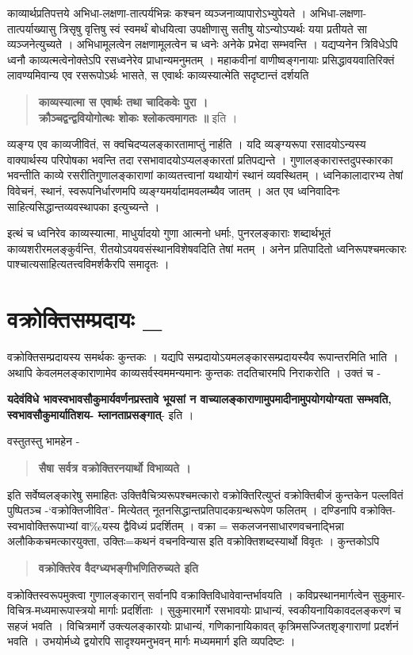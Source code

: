 काव्यार्थप्रतिपत्तये अभिधा-लक्षणा-तात्पर्यभिन्नः कश्चन व्यञ्जनाव्यापारोऽभ्युपेयते । अभिधा-लक्षणा-तात्पर्याख्यासु त्रिसृषु वृत्तिषु स्वं स्वमर्थं बोधयित्वा उपक्षीणासु सतीषु योऽन्योऽप्यर्थः यया प्रतीयते सा व्यञ्जनेत्युच्यते । अभिधामूलत्वेन लक्षणामूलत्वेन च ध्वनेः अनेके प्रभेदा सम्भवन्ति । यद्यप्यनेन त्रिविधेऽपि ध्वनौ काव्यत्मत्वेनोक्तेऽपि रसध्वनेरेव प्राधान्यमनुमतम् । महाकवीनां वाणीष्वङ्गनायाः प्रसिद्धावयवातिरिक्तं लावण्यमिवान्य एव रसरूपोऽर्थः भासते, स एवार्थः काव्यस्यात्मेति सदृष्टान्तं दर्शयति 
\begin{verse}
\textbf{काव्यस्यात्मा स एवार्थः तथा चादिकवेः पुरा ।\\
क्रौञ्चद्वन्द्ववियोगोत्थः शोकः श्लोकत्वमागतः ॥} इति ।
\end{verse}
व्यङ्ग्य एव काव्यजीवितं, स क्वचिदप्यलङ्कारतामाप्तुं नार्हति । यदि व्यङ्ग्यरूपा रसादयोऽन्यस्य वाक्यार्थस्य परिपोषका भवन्ति तदा रसभावादयोऽप्यलङ्कारतां प्रतिपद्यन्ते । गुणालङ्कारास्तदुपस्कारका भवन्तीति काव्ये रसरीतिगुणालङ्काराणां काव्यतत्त्वानां यथायोगं स्थानं व्यवस्थितम् । ध्वनिकालादारभ्य तेषां विवेचनं, स्थानं, स्वरूपनिर्धारणमपि व्यङ्ग्यमर्यादामवलम्ब्यैव जातम् । अत एव ध्वनिवादिनः साहित्यसिद्धान्तव्यवस्थापका इत्युच्यन्ते ।

इत्थं च ध्वनिरेव काव्यस्यात्मा, माधुर्यादयो गुणा आत्मनो धर्माः, पुनरलङ्काराः शब्दार्थभूतं काव्यशरीरमलङ्कुर्वन्ति, रीतयोऽवयवसंस्थानविशेषवदिति तेषां मतम् । अनेन प्रतिपादितो ध्वनिरूपश्चमत्कारः पाश्चात्यसाहित्यतत्त्वविमर्शकैरपि समादृतः ।

\section*{ वक्रोक्तिसम्प्रदायः \_} 

वक्रोक्तिसम्प्रदायस्य समर्थकः कुन्तकः । यद्यपि सम्प्रदायोऽयमलङ्कारसम्प्रदायस्यैव रूपान्तरमिति भाति । अथापि केवलमलङ्काराणामेव काव्यसर्वस्वममन्यमानः कुन्तकः तदतिचारमपि निराकरोति । उक्तं च - 

\textbf{यदेवंविधे भावस्वभावसौकुमार्यवर्णनप्रस्तावे भूयसां न वाच्यालङ्काराणामुपमादीनामुपयोगयोग्यता सम्भवति, स्वभावसौ\-कुमार्यातिशय- म्लानताप्रसङ्गात्}- इति । 

वस्तुतस्तु भामहेन - 
\begin{verse}
\textbf{सैषा सर्वत्र वक्रोक्तिरनयार्थो विभाव्यते । }
\end{verse}
इति सर्वेष्वलङ्कारेषु समाहितः उक्तिवैचित्र्यरूपश्चमत्कारो वक्रोक्तिरित्युप्तं वक्रोक्तिबीजं कुन्तकेन पल्लवितं पुष्पितञ्च -‘वक्रोक्तिजीवित’- मित्येतत् नूतनसिद्धान्तप्रतिपादकग्रन्थरूपेण फलितम् । दण्डिनापि वक्रोक्ति-स्वभावोक्तिरूपाभ्यां वा‰यस्य द्वैविध्यं प्रदर्शितम् । वक्रा = सकलजनसाधारणवचनाद्भिन्ना अलौकिकचमत्कारयुक्ता, उक्तिः=कथनं वचनविन्यास इति वक्रोक्तिशब्दस्यार्थो विवृतः । कुन्तकोऽपि
\begin{verse}
\textbf{वक्रोक्तिरेव वैदग्ध्यभङ्गीभणितिरुच्यते इति }
\end{verse}
वक्रोक्तिस्वरूपमुक्त्वा गुणालङ्कारान् सर्वानपि वक्राक्तिविधावेवान्तर्भावयति । कविप्रस्थानमार्गत्वेन सुकुमार-विचित्र-मध्यमारूपास्त्रयो मार्गाः प्रदर्शिताः । सुकुमारमार्गे रसभावयोः प्राधान्यं, स्वकीयनायिकावदलङ्करणं च सहजं भवति । विचित्रमार्गे उक्त्यलङ्कारयोः प्राधान्यं, गणिकानायिकावत् कृत्रिमसज्जितशृङ्गाराणां प्रदर्शनं भवति । उभयोर्मध्ये द्वयोरपि सादृश्यमनुभवन् मार्गः मध्यममार्ग इति व्यपदिष्टः ।

